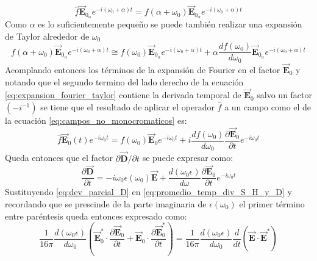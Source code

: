 \documentclass[../tesis_main_file.tex]{subfiles}
\begin{document}
\begin{equation}
\widehat{f}\overrightarrow{\textbf{E}}_{0_\alpha}e^{-i(\omega_0 + \alpha )t} = f(\alpha + \omega _0)\overrightarrow{\textbf{E}}_{0_\alpha}e^{-i(\omega _0 + \alpha )t}
\end{equation}
Como $\alpha$ es lo suficientemente pequeño se puede también realizar una expansión de Taylor alrededor de $\omega_0$
\begin{equation}
\label{eq:expansion_fourier_taylor}
f(\alpha + \omega _0)\overrightarrow{\textbf{E}}_{0_\alpha}e^{-i(\omega _0 + \alpha )t} \cong f(\omega_0)\overrightarrow{\textbf{E}}_{0_\alpha}e^{-i(\omega_0 + \alpha)t} + \alpha \frac{df(\omega_0)}{d\omega_0}\overrightarrow{\textbf{E}}_{0_\alpha}e^{-i(\omega_0 + \alpha)t}
\end{equation}
Acomplando entonces los términos de la expansión de Fourier en el factor $\overrightarrow{\textbf{E}}_0$ y notando que el segundo termino del lado derecho de la ecuación \ref{eq:expansion_fourier_taylor} contiene la derivada temporal de $\overrightarrow{\textbf{E}}_0$ salvo un factor $(-i^{-1})$ se tiene que el resultado de aplicar el operador $\widehat{f}$ a un campo como el de la ecuación \ref{eq:campos_no_monocromaticos} es:
\begin{equation}
\widehat{f}\overrightarrow{\textbf{E}}_0(t)e^{-i\omega_0 t} = f(\omega_0)\overrightarrow{\textbf{E}}_0e^{-i\omega_0 t} + i\frac{df(\omega_0)}{d\omega_0}\frac{\partial \overrightarrow{\textbf{E}}_0}{\partial t}e^{-i\omega_0 t}
\end{equation}
Queda entonces que el factor $\partial \overrightarrow{\textbf{D}}/\partial t$ se puede expresar como:
\begin{equation}
\label{eq:dev_parcial_D}
\frac{\partial \overrightarrow{\textbf{D}}}{\partial t}= -i \omega_0 \epsilon (\omega_0)\overrightarrow{\textbf{E}} + \frac{d(\omega_0 \epsilon)}{d\omega}\frac{\partial \overrightarrow{\textbf{E}}_0}{\partial t}e^{-i\omega_0 t}
\end{equation}
Sustituyendo \ref{eq:dev_parcial_D} en  \ref{eq:promedio_temp_div_S_H_y_D} y recordando que se prescinde de la parte imaginaria de $\epsilon(\omega_0)$ el primer término entre paréntesis queda entonces expresado como:
\begin{equation}
\frac{1}{16\pi}\frac{d(\omega_0 \epsilon)}{d\omega_0}\left(\overrightarrow{\textbf{E}}_0^* \cdot \frac{\partial \overrightarrow{\textbf{E}}_0}{\partial t} + \overrightarrow{\textbf{E}}_0 \cdot \frac{\partial \overrightarrow{\textbf{E}}_0^*}{\partial t}\right) = \frac{1}{16\pi}\frac{d(\omega_0 \epsilon)}{d\omega_0}\frac{d}{dt}\left(\overrightarrow{\textbf{E}}\cdot \overrightarrow{\textbf{E}}^*\right)
\end{equation}
\end{document}
